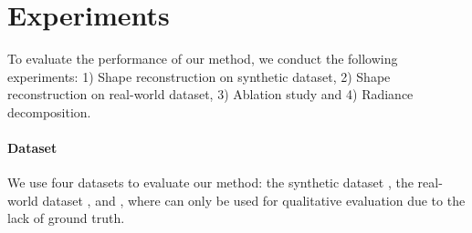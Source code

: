 


\section{Experiments}
\label{sec:exp}
To evaluate the performance of our method, we conduct the following experiments: 1) Shape reconstruction 
on synthetic dataset, 2) Shape reconstruction on real-world dataset, 3) Ablation study and 4) Radiance decomposition.





	

\vspace{-1.4em}\paragraph{Dataset\quad}  We use four datasets to evaluate our method: the synthetic dataset \smvp, the real-world dataset \rmvp,
\pandora and \pisr, where \pandora can only be used for qualitative evaluation due to the lack of ground truth.



